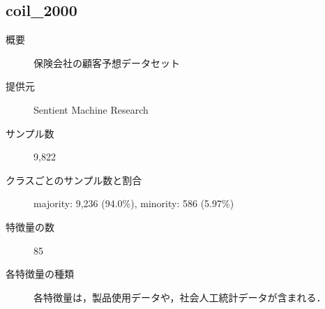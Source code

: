 \subsection{coil\_2000}
\begin{description}
    \item[概要] 保険会社の顧客予想データセット\cite{coil2000}
    \item[提供元] Sentient Machine Research
    \item[サンプル数] 9,822
    \item[クラスごとのサンプル数と割合] majority: 9,236 (94.0\%), minority: 586 (5.97\%) 

    \item[特徴量の数] 85
    \item[各特徴量の種類] 各特徴量は，製品使用データや，社会人工統計データが含まれる．
\end{description}


